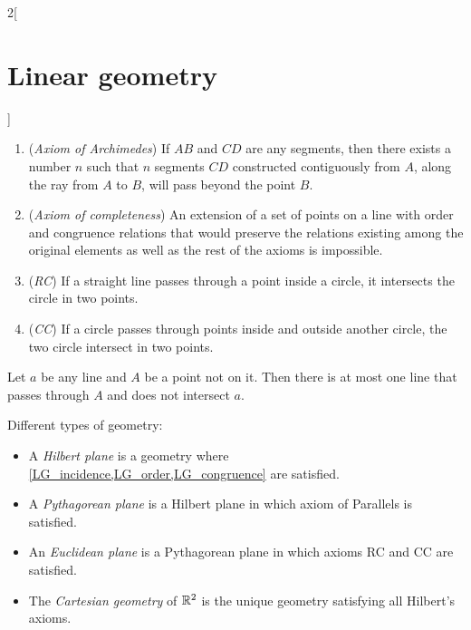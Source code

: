 \documentclass[../../../main.tex]{subfiles}
\begin{document}
\begin{multicols}{2}[\section{Linear geometry}]
\begin{axiom}
    \hfill
    \begin{enumerate}
      \item (\emph{Axiom of Archimedes}) If $AB$ and $CD$ are any segments, then there exists a number $n$ such that $n$ segments $CD$ constructed contiguously from $A$, along the ray from $A$ to $B$, will pass beyond the point $B$.
      \item (\emph{Axiom of completeness}) An extension of a set of points on a line with order and congruence relations that would preserve the relations existing among the original elements as well as the rest of the axioms is impossible.
      \item (\emph{RC}) If a straight line passes through a point inside a circle, it intersects the circle in two points.
      \item (\emph{CC}) If a circle passes through points inside and outside another circle, the two circle intersect in two points.
    \end{enumerate}
  \end{axiom}
  \begin{axiom}
    Let $a$ be any line and $A$ be a point not on it. Then there is at most one line that passes through $A$ and does not intersect $a$.
  \end{axiom}
  \begin{definition}
    Different types of geometry:
    \begin{itemize}
      \item A \emph{Hilbert plane} is a geometry where \cref{LG_incidence,LG_order,LG_congruence} are satisfied.
      \item A \emph{Pythagorean plane} is a Hilbert plane in which axiom of Parallels is satisfied.
      \item An \emph{Euclidean plane} is a Pythagorean plane in which axioms RC and CC are satisfied.
      \item The \emph{Cartesian geometry} of $\mathbb{R}^2$ is the unique geometry satisfying all Hilbert's axioms.
    \end{itemize}
  \end{definition}

\end{multicols}
\end{document}

